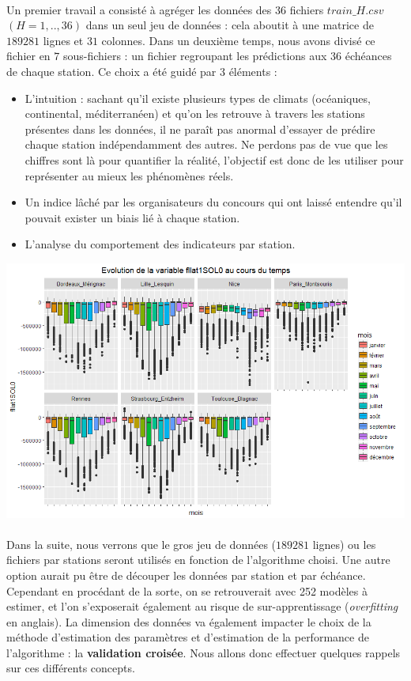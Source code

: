 \documentclass[14pt, openany]{article}
\begin{document}
\paragraph{}
Un premier travail a consisté à agréger les données des 36 fichiers $train\_H.csv$ $(H=1,..,36)$ dans un seul jeu de données : cela aboutit à une matrice de $189 281$ lignes et $31$ colonnes. Dans un deuxième temps, nous avons divisé ce fichier en $7$ sous-fichiers : un fichier regroupant les prédictions aux 36 échéances de chaque station. Ce choix a été guidé par 3 éléments :
\begin{itemize}
\item L'intuition : sachant qu'il existe plusieurs types de climats (océaniques, continental, méditerranéen) et qu'on les retrouve à travers les stations présentes dans les données, il ne paraît pas anormal d'essayer de prédire chaque station indépendamment des autres. Ne perdons pas de vue que les chiffres sont là pour quantifier la réalité, l'objectif est donc de les utiliser pour représenter au mieux les phénomènes réels.
\item Un indice lâché par les organisateurs du concours qui ont laissé entendre qu'il pouvait exister un biais lié à chaque station.
\item L'analyse du comportement des indicateurs par station.
\end{itemize}
\includegraphics[width=17cm]{Images/fllat.png}
\begin{center}
\label{fig1}
\end{center}
\paragraph{}
Dans la suite, nous verrons que le gros jeu de données ($189281$ lignes) ou les fichiers par stations seront utilisés en fonction de l'algorithme choisi. Une autre option aurait pu être de découper les données par station et par échéance. Cependant en procédant de la sorte, on se retrouverait avec 252 modèles à estimer, et l'on s'exposerait également au risque de sur-apprentissage (\textit{overfitting} en anglais). La dimension des données va également impacter le choix de la méthode d'estimation des paramètres et d'estimation de la performance de l'algorithme : la \textbf{validation croisée}. Nous allons donc effectuer quelques rappels sur ces différents concepts.
\end{document}
